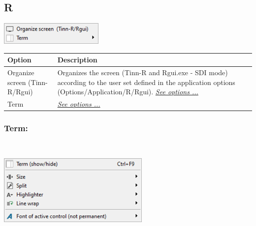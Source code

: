 \hypertarget{menu_view_r}{}
\subsection{R}

\includegraphics[scale=0.50]{./res/menu_view_r.png}\\

\begin{scriptsize}
  \begin{tabularx}{\textwidth}{>{\hsize=0.5\hsize}X>{\hsize=0.7\hsize}X}\\
    \hline
    \textbf{Option} & \textbf{Description} \\
    \hline
    Organize screen (Tinn-R/Rgui) & Organizes the screen (Tinn-R and Rgui.exe - SDI mode) according to the user set defined
     in the application options (Options/Application/R/Rgui). \textit{\href{\#working\_app\_r}{See options ...}} \\
    Term & \textit{\href{\#menu\_view\_r\_term}{See options ...}} \\
    \hline
  \end{tabularx}
\end{scriptsize}

\newpage
\hypertarget{menu_view_r_term}{}
\subsubsection{Term:}\\

\includegraphics[scale=0.50]{./res/menu_view_r_term.png}\\

